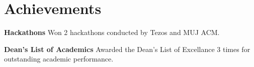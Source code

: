 \section{Achievements}
 \begin{itemize}[leftmargin=0.15in, label={}]
    \small{
    \item{
     \textbf{Hackathons}{ Won 2 hackathons conducted by Tezos and MUJ ACM.}
    }
    \item{
     \textbf{Dean's List of Academics}{ Awarded the Dean's List of Excellance 3 times for outstanding academic performance.} \\
    }}
 \end{itemize}